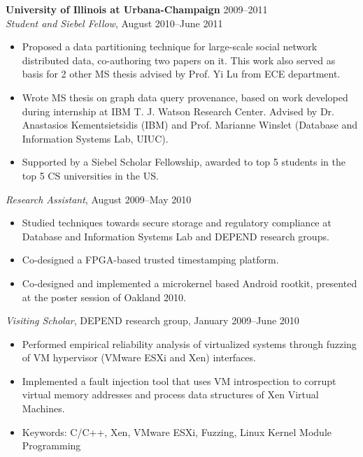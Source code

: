 \documentclass[line,margin]{res}
\begin{document}
\begin{resume}
                \textbf{University of Illinois at Urbana-Champaign} \hfill 2009--2011 \\
                {\sl Student and Siebel Fellow}, August 2010--June 2011
                \begin{itemize}  \itemsep -2pt
                \item Proposed a data partitioning technique for large-scale social network distributed data, 
                co-authoring two papers on it.  This work also served as basis for 2 other MS thesis advised 
                by Prof. Yi Lu from ECE department.
                \item Wrote MS thesis on graph data query provenance, based on work developed during 
                internship at IBM T. J. Watson Research Center. Advised by Dr. Anastasios Kementsietsidis 
                (IBM) and Prof. Marianne Winslet (Database and Information Systems Lab, UIUC).
                \item Supported by a Siebel Scholar Fellowship, awarded to top 5 students in the top 5 CS 
                universities in the US.
                \end{itemize}
                {\sl Research Assistant}, August 2009--May 2010
                \begin{itemize}  \itemsep -2pt
                \item Studied techniques towards secure storage and regulatory compliance at Database
                and Information Systems Lab and DEPEND research groups.
                \item Co-designed a FPGA-based trusted timestamping platform.
                \item Co-designed and implemented a microkernel based Android rootkit, presented at the 
                poster session of Oakland 2010.
                \end{itemize}
                {\sl Visiting Scholar}, DEPEND research group, January 2009--June 2010
                \begin{itemize}  \itemsep -2pt
                \item Performed empirical reliability analysis of virtualized systems through fuzzing of VM 
                hypervisor (VMware ESXi and Xen) interfaces.
                \item Implemented a fault injection tool that uses VM introspection to corrupt virtual memory 
                addresses and process data structures of Xen Virtual Machines.
                \item Keywords: C/C++, Xen, VMware ESXi, Fuzzing, Linux Kernel Module Programming
                \end{itemize}
                

\end{resume}
\end{document}
